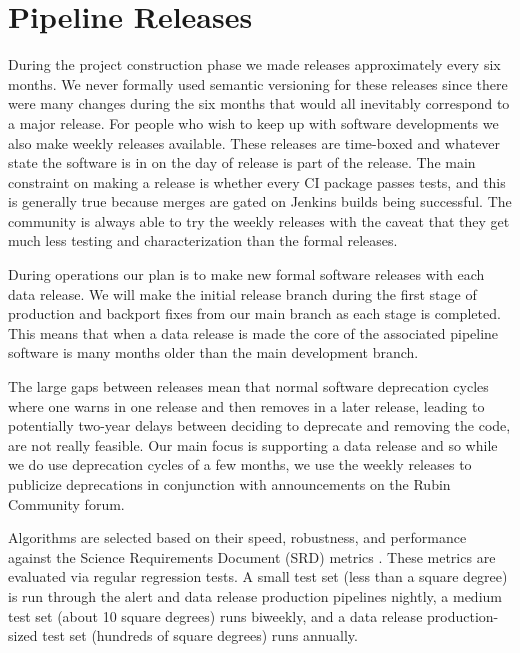 \section{Pipeline Releases}

During the project construction phase we made releases approximately every six months.
We never formally used semantic versioning for these releases since there were many changes during the six months that would all inevitably correspond to a major release.
For people who wish to keep up with software developments we also make weekly releases available.
These releases are time-boxed and whatever state the software is in on the day of release is part of the release.
The main constraint on making a release is whether every CI package passes tests, and this is generally true because merges are gated on Jenkins builds being successful.
The community is always able to try the weekly releases with the caveat that they get much less testing and characterization than the formal releases.

During operations our plan is to make new formal software releases with each data release.
We will make the initial release branch during the first stage of production and backport fixes from our main branch as each stage is completed.
This means that when a data release is made the core of the associated pipeline software is many months older than the main development branch.

The large gaps between releases mean that normal software deprecation cycles where one warns in one release and then removes in a later release, leading to potentially two-year delays between deciding to deprecate and removing the code, are not really feasible.
Our main focus is supporting a data release and so while we do use deprecation cycles of a few months, we use the weekly releases to publicize deprecations in conjunction with announcements on the Rubin Community forum.

Algorithms are selected based on their speed, robustness, and performance against the Science Requirements Document (SRD) metrics \citep{LPM-17}.
These metrics are evaluated via regular regression tests.
A small test set (less than a square degree) is run through the alert and data release production pipelines nightly, a medium test set (about 10 square degrees) runs biweekly, and a data release production-sized test set (hundreds of square degrees) runs annually.

